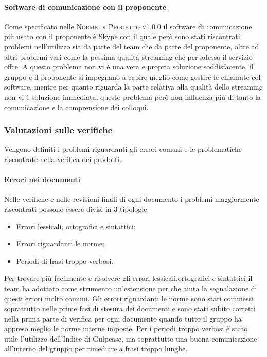 \documentclass[../piano-di-qualifica.tex]{subfiles}
\begin{document}
\paragraph{Software di comunicazione con il proponente}
\label{sub:latex}
Come specificato nelle \textsc{Norme di Progetto v1.0.0} il software di comunicazione più usato con il proponente è Skype con il quale però sono stati riscontrati problemi nell'utilizzo sia da parte del team che da parte del proponente, oltre ad altri problemi vari come la pessima qualità streaming che per adesso il servizio offre.
A questo problema non vi è una vera e propria soluzione soddisfacente, il gruppo e il proponente si impegnano a capire meglio come gestire le chiamate col software, mentre per quanto riguarda la parte relativa alla qualità dello streaming non vi è soluzione immediata, questo problema però non influenza più di tanto la comunicazione e la comprensione dei colloqui.

\subsubsection{Valutazioni sulle verifiche}
\label{sub:valutazioni_verifiche}
Vengono definiti i problemi riguardanti gli errori comuni e le problematiche riscontrate nella verifica dei prodotti.

\paragraph{Errori nei documenti}
\label{sub:errori_documenti}
Nelle verifiche e nelle revisioni finali di ogni documento i problemi maggiormente riscontrati possono essere divisi in 3 tipologie:
\begin{itemize}
    \item Errori lessicali, ortografici e sintattici;
    \item Errori riguardanti le norme;
    \item Periodi di frasi troppo verbosi.
\end{itemize}
Per trovare più facilmente e risolvere gli errori lessicali,ortografici e sintattici il team ha adottato come strumento un'estensione per  che aiuta la segnalazione di questi errori molto comuni.
Gli errori riguardanti le norme sono stati commessi soprattutto nelle prime fasi di stesura dei documenti e sono stati subito corretti nella prima parte di verifica per ogni documento quando tutto il gruppo ha appreso meglio le norme interne imposte.
Per i periodi troppo verbosi è stato utile l'utilizzo dell'Indice di Gulpease, ma soprattutto una buona comunicazione all'interno del gruppo per rimediare a frasi troppo lunghe.
\end{document}
